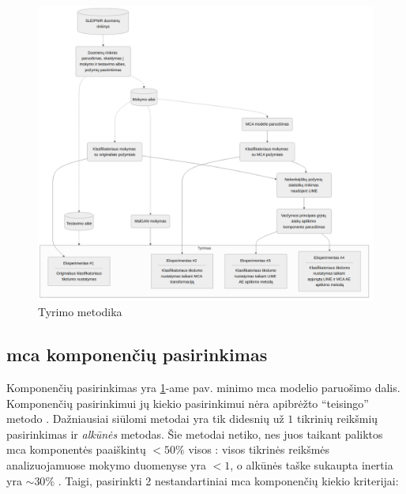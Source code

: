 \begin{figure}[h]
    \centering
    \includegraphics[width=\textwidth]{images/methodology.png}
    \caption{Tyrimo metodika}
    \label{fig:methodology}
\end{figure}

\clearpage
\subsection{\gls{mca} komponenčių pasirinkimas}\label{sec:method:mca_comp_selection}
Komponenčių pasirinkimas yra \ref{fig:methodology}-ame pav. minimo \gls{mca} modelio paruošimo dalis. Komponenčių pasirinkimui \ty jų kiekio pasirinkimui nėra apibrėžto \enquote{teisingo} metodo \cite{abdiPrincipalComponentAnalysis2010}. Dažniausiai siūlomi metodai yra tik didesnių už $1$ tikrinių reikšmių pasirinkimas ir \textit{alkūnės}  metodas. Šie metodai netiko, nes juos taikant paliktos \gls{mca} komponentės paaiškintų $<50\%$ visos : visos tikrinės reikšmės analizuojamuose mokymo duomenyse yra $<1$, o alkūnės taške sukaupta \gls{inertia} yra $\sim 30\%$ . Taigi, pasirinkti 2 nestandartiniai \gls{mca} komponenčių kiekio kriterijai: 

